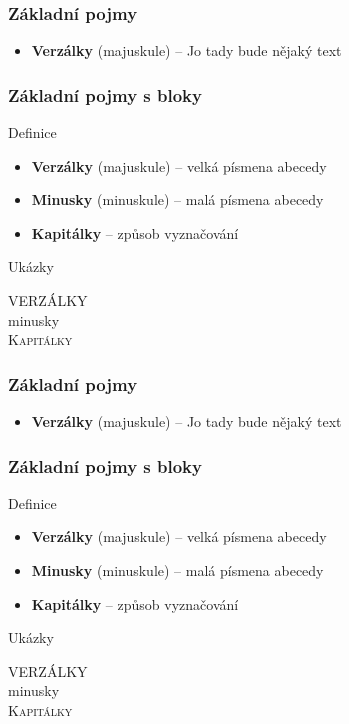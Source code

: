 \documentclass{beamer}
\begin{document}
\begin{frame}
    \frametitle{Základní pojmy}
    \bigskip
    \begin{itemize}
        \item \textbf{Verzálky} (majuskule) -- Jo tady bude nějaký text
    \end{itemize}
\end{frame}

\begin{frame}
    \frametitle{Základní pojmy s bloky}
    \begin{block}{Definice}
        \begin{itemize}
            \item \textbf{Verzálky} (majuskule) -- velká písmena abecedy
            \item \textbf{Minusky} (minuskule) -- malá písmena abecedy
            \item \textbf{Kapitálky} -- způsob vyznačování
        \end{itemize}
    \end{block}
    \begin{alertblock}{Ukázky}
        \begin{center}
            {\Huge
            VERZÁLKY \\
            minusky \\[2mm]
            \textsc{Kapitálky}}
        \end{center}
    \end{alertblock}
\end{frame}

\begin{frame}
    \frametitle{Základní pojmy}
    \bigskip
    \begin{itemize}
        \item \textbf{Verzálky} (majuskule) -- Jo tady bude nějaký text
    \end{itemize}
\end{frame}

\begin{frame}
    \frametitle{Základní pojmy s bloky}
    \begin{block}{Definice}
        \begin{itemize}
            \item \textbf{Verzálky} (majuskule) -- velká písmena abecedy
            \item \textbf{Minusky} (minuskule) -- malá písmena abecedy
            \item \textbf{Kapitálky} -- způsob vyznačování
        \end{itemize}
    \end{block}
    \begin{exampleblock}{Ukázky}
        \begin{center}
            {\Huge
            VERZÁLKY \\
            minusky \\[2mm]
            \textsc{Kapitálky}}
        \end{center}
    \end{exampleblock}
\end{frame}
\end{document}
